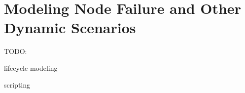 \chapter{Modeling Node Failure and Other Dynamic Scenarios}
\label{cha:lifecycle}

TODO:

lifecycle modeling

scripting
 



